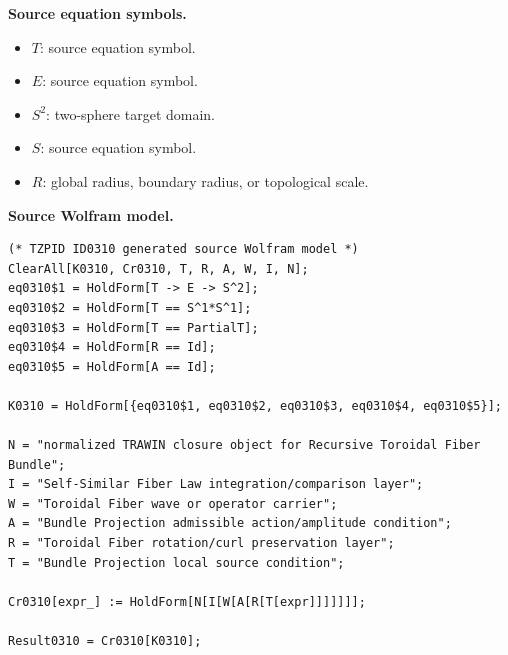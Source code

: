 \begin{minipage}[t]{0.49\linewidth}
\begingroup
\small
\raggedright
\textbf{Source equation symbols.}\par
\begin{itemize}[leftmargin=1.35em,itemsep=1pt,topsep=1pt,parsep=0pt]
    \item $T$: source equation symbol.
    \item $E$: source equation symbol.
    \item $S^2$: two-sphere target domain.
    \item $S$: source equation symbol.
    \item $R$: global radius, boundary radius, or topological scale.
\end{itemize}
\endgroup
\end{minipage}\hfill
\begin{minipage}[t]{0.47\linewidth}
\begingroup
\scriptsize
\raggedright
\textbf{Source Wolfram model.}\par
\begin{Verbatim}[fontsize=\tiny,breaklines=true,breakanywhere=true]
(* TZPID ID0310 generated source Wolfram model *)
ClearAll[K0310, Cr0310, T, R, A, W, I, N];
eq0310$1 = HoldForm[T -> E -> S^2];
eq0310$2 = HoldForm[T == S^1*S^1];
eq0310$3 = HoldForm[T == PartialT];
eq0310$4 = HoldForm[R == Id];
eq0310$5 = HoldForm[A == Id];

K0310 = HoldForm[{eq0310$1, eq0310$2, eq0310$3, eq0310$4, eq0310$5}];

N = "normalized TRAWIN closure object for Recursive Toroidal Fiber Bundle";
I = "Self-Similar Fiber Law integration/comparison layer";
W = "Toroidal Fiber wave or operator carrier";
A = "Bundle Projection admissible action/amplitude condition";
R = "Toroidal Fiber rotation/curl preservation layer";
T = "Bundle Projection local source condition";

Cr0310[expr_] := HoldForm[N[I[W[A[R[T[expr]]]]]]];

Result0310 = Cr0310[K0310];
\end{Verbatim}
\endgroup
\end{minipage}

